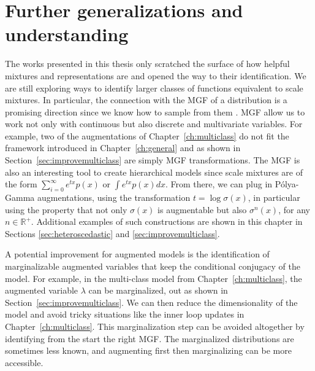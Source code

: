 

\graphicspath{{8/figures/}}


\section{Further generalizations and understanding}
The works presented in this thesis only scratched the surface of how helpful mixtures and representations are and opened the way to their identification.
We are still exploring ways to identify larger classes of functions equivalent to scale mixtures.
In particular, the connection with the \acf{MGF} of a distribution is a promising direction since we know how to sample from them \cite{ridout2009generating}.
\ac{MGF} allow us to work not only with continuous but also discrete and multivariate variables.
For example, two of the augmentations of Chapter~\ref{ch:multiclass} do not fit the framework introduced in Chapter~\ref{ch:general} and as shown in Section~\ref{sec:improvemulticlass} are simply \ac{MGF} transformations.
The \ac{MGF} is also an interesting tool to create hierarchical models since scale mixtures are of the form $\sum_{i=0}^\infty e^{tx} p(x)$ or $\int e^{tx}p(x)dx$.
From there, we can plug in P\'olya-Gamma augmentations, using the transformation $t=\log \sigma(x)$, in particular using the property that not only $\sigma(x)$ is augmentable but also $\sigma^n(x)$, for any $n\in \mathbb{R}^+$.
Additional examples of such constructions are shown in this chapter in Sections \ref{sec:heteroscedastic} and \ref{sec:improvemulticlass}.

A potential improvement for augmented models is the identification of marginalizable augmented variables that keep the conditional conjugacy of the model.
For example, in the multi-class model from Chapter~\ref{ch:multiclass}, the augmented variable $\lambda$ can be marginalized, out as shown in Section~\ref{sec:improvemulticlass}.
We can then reduce the dimensionality of the model and avoid tricky situations like the inner loop updates in Chapter~\ref{ch:multiclass}.
This marginalization step can be avoided altogether by identifying from the start the right \ac{MGF}. The marginalized distributions are sometimes less known, and augmenting first then marginalizing can be more accessible.


